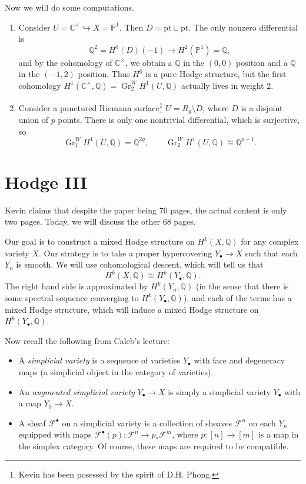 \documentclass[leqno, openany]{memoir}
\theoremstyle{definition}
\theoremstyle{remark}
\theoremstyle{plain}
\theoremstyle{definition}
\theoremstyle{remark}
\newcommand{\C}{\mathbb{C}}
\newcommand{\Q}{\mathbb{Q}}
\renewcommand{\P}{\mathbb{P}}
\newcommand{\mc}[1]{\mathcal{#1}}
\newcommand{\mr}[1]{\mathrm{#1}}
\newcommand{\on}[1]{\operatorname{#1}}
\begin{document}
Now we will do some computations.
\begin{enumerate}
    \item Consider $U = \C^{\times} \hookrightarrow X = \P^1$. Then $D = \mr{pt} \sqcup \mr{pt}$. The only nonzero differential is
        \[ \Q^2 = H^0(D)(-1) \to H^2(\P^1) = \Q, \]
        and by the cohomology of $\C^{\times}$, we obtain a $\Q$ in the $(0,0)$ position and a $\Q$ in the $(-1,2)$ position. Thus $H^0$ is a pure Hodge structure, but the first cohomology $H^1(\C^{\times}, \Q) = \operatorname{Gr}_2^W H^1(U, \Q)$ actually lives in weight $2$.
    \item Consider a punctured Riemann surface\footnote{Kevin has been posessed by the spirit of D.H. Phong.} $U = R_g \setminus D$, where $D$ is a disjoint union of $p$ points. There is only one nontrivial differential, which is surjective, so
        \[ \on{Gr}_1^W H^1(U, \Q) = \Q^{2g}, \qquad \on{Gr}_2^W H^1(U, \Q) \cong \Q^{p-1}. \]
\end{enumerate}

\section{Hodge III}%
\label{sec:hodge_iii}

Kevin claims that despite the paper being 70 pages, the actual content is only two pages. Today, we will discuss the other 68 pages.

Our goal is to construct a mixed Hodge structure on $H^k(X, \Q)$ for any complex variety $X$. Our strategy is to take a proper hypercovering $Y_{\bullet} \to X$ such that each $Y_n$ is smooth. We will use cohomological descent, which will tell us that
\[ H^k(X, \Q) \cong H^k(Y_{\bullet}, \Q). \]
The right hand side is approximated by $H^k(Y_n, \Q)$ (in the sense that there is some spectral sequence converging to $H^k(Y_{\bullet}, \Q)$), and each of the terms has a mixed Hodge structure, which will induce a mixed Hodge structure on $H^k(Y_{\bullet}, \Q)$.

Now recall the following from Caleb's lecture:
\begin{itemize}
    \item A \textit{simplicial variety} is a sequence of varieties $Y_{\bullet}$ with face and degeneracy maps (a simplicial object in the category of varieties).
    \item An \textit{augmented simplicial variety} $Y_{\bullet} \to X$ is simply a simplicial variety $Y_{\bullet}$ with a map $Y_0 \to X$.
    \item A sheaf $\mc{F}^{\bullet}$ on a simplicial variety is a collection of sheaves $\mc{F}^n$ on each $Y_n$ equipped with maps $\mc{F}^{\bullet}(p) \colon \mc{F}^n \to p_* \mc{F}^m$, where $p \colon [n] \to [m]$ is a map in the simplex category. Of course, these maps are required to be compatible.
\end{itemize}
\end{document}
